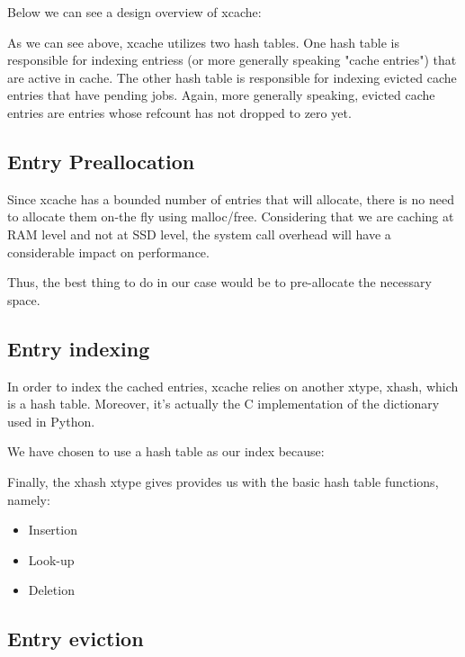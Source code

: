 Below we can see a design overview of xcache:


As we can see above, xcache utilizes two hash tables. One hash table is 
responsible for indexing entriess (or more generally speaking "cache entries") 
that are active in cache.  The other hash table is responsible for indexing 
evicted cache entries that have pending jobs.  Again, more generally speaking, 
evicted cache entries are entries whose refcount has not dropped to zero yet.

\subsection{Entry Preallocation}\label{sec:entry-prealloc-design}

Since xcache has a bounded number of entries that will allocate, there is no 
need to allocate them on-the fly using malloc/free. Considering that we are 
caching at RAM level and not at SSD level, the system call overhead will have a 
considerable impact on performance.

Thus, the best thing to do in our case would be to pre-allocate the necessary 
space.

\subsection{Entry indexing}\label{sec:xcache-index-design}

In order to index the cached entries, xcache relies on another xtype, xhash, 
which is a hash table. Moreover, it's actually the C implementation of the 
dictionary used in Python.

We have chosen to use a hash table as our index because:

Finally, the xhash xtype gives provides us with the basic hash table functions, 
namely:

\begin{itemize}
	\item Insertion
	\item Look-up
	\item Deletion
\end{itemize}

\subsection{Entry eviction}

